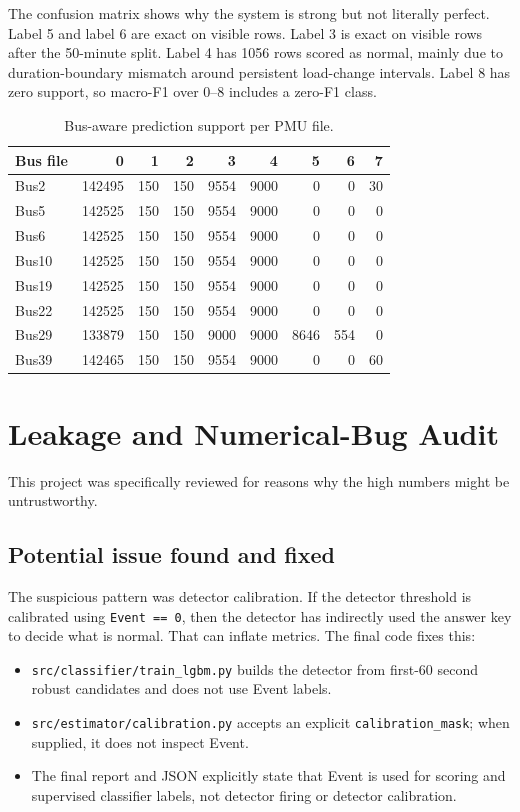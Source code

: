 \documentclass[11pt]{article}
\begin{document}
The confusion matrix shows why the system is strong but not literally perfect.
Label 5 and label 6 are exact on visible rows. Label 3 is exact on visible rows
after the 50-minute split. Label 4 has 1056 rows scored as normal, mainly due to
duration-boundary mismatch around persistent load-change intervals. Label 8 has
zero support, so macro-F1 over 0--8 includes a zero-F1 class.

\begin{table}[H]
\centering
\caption{Bus-aware prediction support per PMU file.}
\scriptsize
\begin{tabular}{lrrrrrrrr}
\toprule
Bus file & 0 & 1 & 2 & 3 & 4 & 5 & 6 & 7\\
\midrule
Bus2 & 142495 & 150 & 150 & 9554 & 9000 & 0 & 0 & 30\\
Bus5 & 142525 & 150 & 150 & 9554 & 9000 & 0 & 0 & 0\\
Bus6 & 142525 & 150 & 150 & 9554 & 9000 & 0 & 0 & 0\\
Bus10 & 142525 & 150 & 150 & 9554 & 9000 & 0 & 0 & 0\\
Bus19 & 142525 & 150 & 150 & 9554 & 9000 & 0 & 0 & 0\\
Bus22 & 142525 & 150 & 150 & 9554 & 9000 & 0 & 0 & 0\\
Bus29 & 133879 & 150 & 150 & 9000 & 9000 & 8646 & 554 & 0\\
Bus39 & 142465 & 150 & 150 & 9554 & 9000 & 0 & 0 & 60\\
\bottomrule
\end{tabular}
\label{tab:bus_support}
\end{table}

\section{Leakage and Numerical-Bug Audit}

This project was specifically reviewed for reasons why the high numbers might be
untrustworthy.

\subsection{Potential issue found and fixed}

The suspicious pattern was detector calibration. If the detector threshold is
calibrated using \texttt{Event == 0}, then the detector has indirectly used the
answer key to decide what is normal. That can inflate metrics. The final code
fixes this:

\begin{itemize}
  \item \texttt{src/classifier/train\_lgbm.py} builds the detector from first-60
  second robust candidates and does not use Event labels.
  \item \texttt{src/estimator/calibration.py} accepts an explicit
  \texttt{calibration\_mask}; when supplied, it does not inspect Event.
  \item The final report and JSON explicitly state that Event is used for scoring
  and supervised classifier labels, not detector firing or detector calibration.
\end{itemize}
\end{document}
